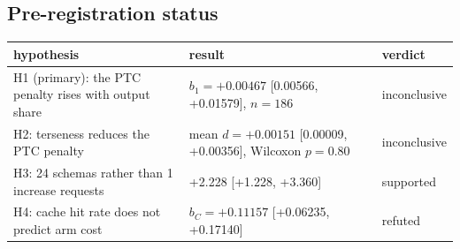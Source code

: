 \documentclass[10pt]{article}
\newcommand*{\mi}{\textminus}   %
\newenvironment{inlinetable}{\par\medskip\noindent\begin{minipage}{\linewidth}\centering\small}{\end{minipage}\par\bigskip}
\begin{document}
\clearpage
\begin{appendices}

\section{Pre-registration status}\label{app:prereg}

\begin{inlinetable}
\label{tab:hypotheses}
\begin{tabular}{@{}L{5.0cm}L{7.2cm}L{3.4cm}@{}}
\toprule
hypothesis & result & verdict \\
\midrule
H1 (primary): the PTC penalty rises with output share & $b_1 = +0.00467$ [\mi{}0.00566, +0.01579], $n = 186$ & inconclusive \\
H2: terseness reduces the PTC penalty & mean $d = +0.00151$ [\mi{}0.00009, +0.00356], Wilcoxon $p = 0.80$ & inconclusive \\
H3: 24 schemas rather than 1 increase requests & +2.228 [+1.228, +3.360] & supported \\
H4: cache hit rate does not predict arm cost & $b_C = +0.11157$ [+0.06235, +0.17140] & refuted \\
\bottomrule
\end{tabular}
\end{inlinetable}


\end{appendices}
\end{document}
